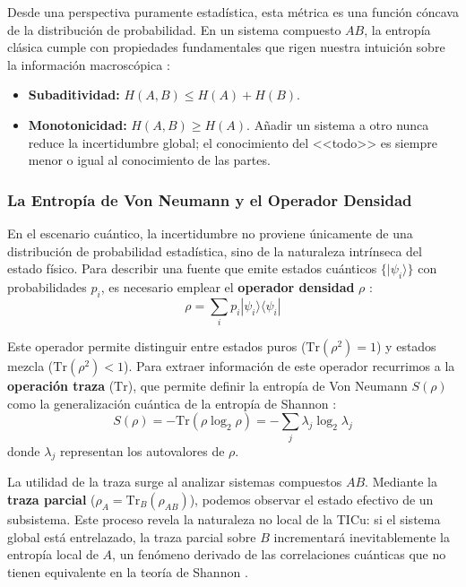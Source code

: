 \documentclass[11pt,a4paper,spanish]{book}
\begin{document}
Desde una perspectiva puramente estadística, esta métrica es una función cóncava de la distribución de probabilidad. En un sistema compuesto $AB$, la entropía clásica cumple con propiedades fundamentales que rigen nuestra intuición sobre la información macroscópica \citep{nielsen2010}:
\begin{itemize}
    \item \textbf{Subaditividad:} $H(A,B) \leq H(A) + H(B)$.
    \item \textbf{Monotonicidad:} $H(A,B) \geq H(A)$. Añadir un sistema a otro nunca reduce la incertidumbre global; el conocimiento del <<todo>> es siempre menor o igual al conocimiento de las partes.
\end{itemize}

\subsubsection{La Entropía de Von Neumann y el Operador Densidad}

En el escenario cuántico, la incertidumbre no proviene únicamente de una distribución de probabilidad estadística, sino de la naturaleza intrínseca del estado físico. Para describir una fuente que emite estados cuánticos $\{|\psi_i\rangle\}$ con probabilidades $p_i$, es necesario emplear el \textbf{operador densidad} $\rho$ \citep{vonneumann1932}:
\begin{equation}
    \rho = \sum_i p_i |\psi_i\rangle \langle \psi_i |
\end{equation}

Este operador permite distinguir entre estados puros ($\text{Tr}(\rho^2) = 1$) y estados mezcla ($\text{Tr}(\rho^2) < 1$). Para extraer información de este operador recurrimos a la \textbf{operación traza} ($\text{Tr}$), que permite definir la entropía de Von Neumann $S(\rho)$ como la generalización cuántica de la entropía de Shannon \citep{vonneumann1932, nielsen2010}:
\begin{equation}
    S(\rho) = -\text{Tr}(\rho \log_2 \rho) = -\sum_j \lambda_j \log_2 \lambda_j
\end{equation}
donde $\lambda_j$ representan los autovalores de $\rho$. 

La utilidad de la traza surge al analizar sistemas compuestos $AB$. Mediante la \textbf{traza parcial} ($\rho_A = \text{Tr}_B(\rho_{AB})$), podemos observar el estado efectivo de un subsistema. Este proceso revela la naturaleza no local de la TICu: si el sistema global está entrelazado, la traza parcial sobre $B$ incrementará inevitablemente la entropía local de $A$, un fenómeno derivado de las correlaciones cuánticas que no tienen equivalente en la teoría de Shannon \citep{schumacher1995}.
\end{document}
